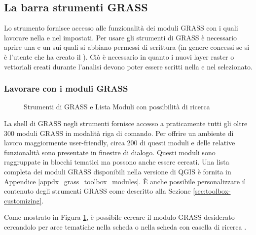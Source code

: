 \subsection{La barra strumenti GRASS}\label{subsec:grass_toolbox}

Lo strumento  fornisce accesso
alle funzionalità dei moduli GRASS con i quali lavorare nella
 e nel  impostati. Per usare gli strumenti
di GRASS è necessario aprire una  e un 
sui quali si abbiano permessi di scrittura (in genere concessi se si è
l'utente che ha creato il ). Ciò è necessario in quanto i
nuovi layer raster o vettoriali creati durante l'analisi devono poter essere
scritti nella  e nel  selezionato.

\subsubsection{Lavorare con i moduli GRASS}

\begin{figure}[h]
\centering
\caption{Strumenti di GRASS e Lista Moduli con possibilità di ricerca \nixcaption}\label{fig:grass_modules}
   \goodgap
\end{figure}

La shell di GRASS negli strumenti fornisce accesso a praticamente tutti gli
oltre 300 moduli GRASS in modalità riga di comando. Per offrire un ambiente di
lavoro maggiormente user-friendly, circa 200 di questi moduli e delle relative
funzionalità sono presentate in finestre di dialogo. Questi moduli sono
raggruppate in blocchi tematici ma possono anche essere cercati. Una lista
completa dei moduli GRASS disponibili nella versione di QGIS \CURRENT
è fornita in Appendice \ref{appdx_grass_toolbox_modules}. È anche possibile
personalizzare il contenuto degli strumenti GRASS come descritto alla Sezione 
\ref{sec:toolbox-customizing}.

Come mostrato in Figura \ref{fig:grass_modules}, è possibile cercare il modulo
GRASS desiderato cercandolo per aree tematiche nella scheda  o nella scheda con casella di ricerca . 

